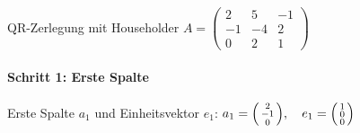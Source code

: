 \begin{example2}[breakable]{QR-Zerlegung mit Householder}
$A = \begin{pmatrix}
2 & 5 & -1\\
-1 & -4 & 2\\
0 & 2 & 1
\end{pmatrix}$

\paragraph{Schritt 1: Erste Spalte}
Erste Spalte $a_1$ und Einheitsvektor $e_1$:
$a_1 = \begin{psmallmatrix} 2\\ -1\\ 0 \end{psmallmatrix}, \quad e_1 = \begin{psmallmatrix} 1\\ 0\\ 0 \end{psmallmatrix}$


\end{example2}

